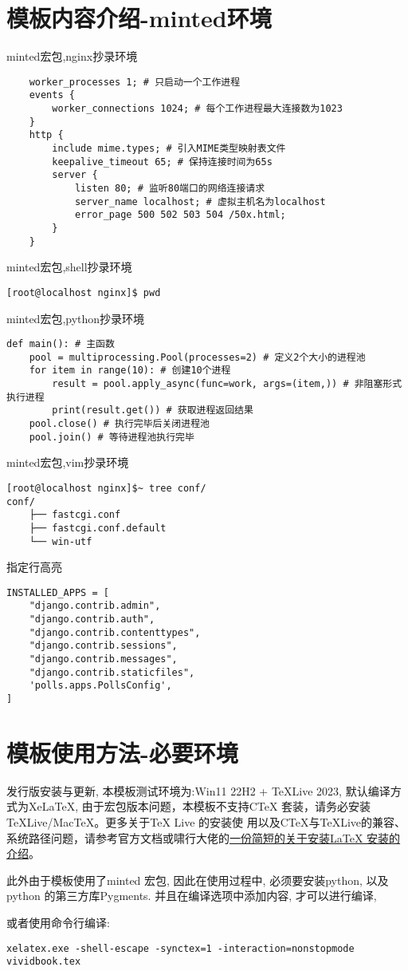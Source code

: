 \section{模板内容介绍-minted环境}
minted宏包,nginx抄录环境
\begin{verbatim}
    worker_processes 1; # 只启动一个工作进程
    events {
        worker_connections 1024; # 每个工作进程最大连接数为1023
    }
    http {
        include mime.types; # 引入MIME类型映射表文件
        keepalive_timeout 65; # 保持连接时间为65s
        server {
            listen 80; # 监听80端口的网络连接请求
            server_name localhost; # 虚拟主机名为localhost
            error_page 500 502 503 504 /50x.html;
        }
    }
\end{verbatim}

minted宏包,shell抄录环境
\begin{verbatim}
[root@localhost nginx]$ pwd
\end{verbatim}

minted宏包,python抄录环境
\begin{verbatim}
def main(): # 主函数
    pool = multiprocessing.Pool(processes=2) # 定义2个大小的进程池
    for item in range(10): # 创建10个进程
        result = pool.apply_async(func=work, args=(item,)) # 非阻塞形式执行进程
        print(result.get()) # 获取进程返回结果
    pool.close() # 执行完毕后关闭进程池
    pool.join() # 等待进程池执行完毕
\end{verbatim}

minted宏包,vim抄录环境
\begin{verbatim}
[root@localhost nginx]$~ tree conf/
conf/
    ├── fastcgi.conf
    ├── fastcgi.conf.default
    └── win-utf
\end{verbatim}
%
指定行高亮
\begin{verbatim}
INSTALLED_APPS = [
    "django.contrib.admin",
    "django.contrib.auth",
    "django.contrib.contenttypes",
    "django.contrib.sessions",
    "django.contrib.messages",
    "django.contrib.staticfiles",
    'polls.apps.PollsConfig',
]
\end{verbatim}


\section{模板使用方法-必要环境}

发行版安装与更新, 本模板测试环境为:Win11 22H2 + TeXLive 2023, 默认编译方式为XeLaTeX,
由于宏包版本问题，本模板不支持C\TeX{} 套装，请务必安装\TeX Live/Mac\TeX{}。更多关于\TeX{} Live 的安装使
用以及C\TeX{}与\TeX Live的兼容、系统路径问题，请参考官方文档或啸行大佬的\href{https://github.com/OsbertWang/install-latex-guide-zh-cn/releases/}{一份简短的关于安装\LaTeX{} 安装的介绍}。

此外由于模板使用了minted 宏包, 因此在使用过程中, 必须要安装python, 以及python 的第三方库Pygments.
并且在编译选项中添加内容, 才可以进行编译,

或者使用命令行编译:
\begin{verbatim}
xelatex.exe -shell-escape -synctex=1 -interaction=nonstopmode vividbook.tex
\end{verbatim}